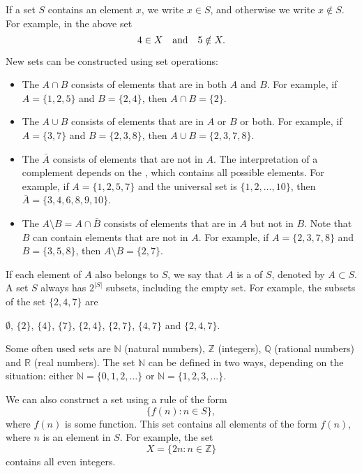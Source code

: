 If a set $S$ contains an element $x$,
we write $x \in S$,
and otherwise we write $x \notin S$.
For example, in the above set
\[4 \in X \hspace{10px}\textrm{and}\hspace{10px} 5 \notin X.\]

\begin{samepage}
New sets can be constructed using set operations:
\begin{itemize}
\item The  $A \cap B$ consists of elements
that are in both $A$ and $B$.
For example, if $A=\{1,2,5\}$ and $B=\{2,4\}$,
then $A \cap B = \{2\}$.
\item The  $A \cup B$ consists of elements
that are in $A$ or $B$ or both.
For example, if $A=\{3,7\}$ and $B=\{2,3,8\}$,
then $A \cup B = \{2,3,7,8\}$.
\item The  $\bar A$ consists of elements
that are not in $A$.
The interpretation of a complement depends on
the , which contains all possible elements.
For example, if $A=\{1,2,5,7\}$ and the universal set is
$\{1,2,\ldots,10\}$, then $\bar A = \{3,4,6,8,9,10\}$.
\item The  $A \setminus B = A \cap \bar B$
consists of elements that are in $A$ but not in $B$.
Note that $B$ can contain elements that are not in $A$.
For example, if $A=\{2,3,7,8\}$ and $B=\{3,5,8\}$,
then $A \setminus B = \{2,7\}$.
\end{itemize}
\end{samepage}

If each element of $A$ also belongs to $S$,
we say that $A$ is a  of $S$,
denoted by $A \subset S$.
A set $S$ always has $2^{|S|}$ subsets,
including the empty set.
For example, the subsets of the set $\{2,4,7\}$ are
\begin{center}
$\emptyset$,
$\{2\}$, $\{4\}$, $\{7\}$, $\{2,4\}$, $\{2,7\}$, $\{4,7\}$ and $\{2,4,7\}$.
\end{center}

Some often used sets are
$\mathbb{N}$ (natural numbers),
$\mathbb{Z}$ (integers),
$\mathbb{Q}$ (rational numbers) and
$\mathbb{R}$ (real numbers).
The set $\mathbb{N}$
can be defined in two ways, depending
on the situation:
either $\mathbb{N}=\{0,1,2,\ldots\}$
or $\mathbb{N}=\{1,2,3,...\}$.

We can also construct a set using a rule of the form
\[\{f(n) : n \in S\},\]
where $f(n)$ is some function.
This set contains all elements of the form $f(n)$,
where $n$ is an element in $S$.
For example, the set
\[X=\{2n : n \in \mathbb{Z}\}\]
contains all even integers.

